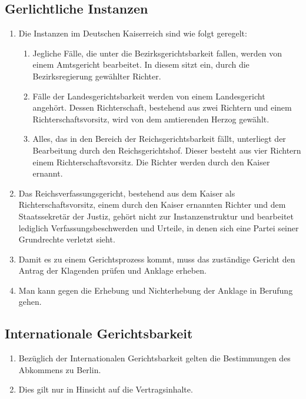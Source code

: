 \documentclass{article}
\begin{document}
\subsection{Gerlichtliche Instanzen}
\begin{enumerate}[(1)]
    \item Die Instanzen im Deutschen Kaiserreich sind wie folgt geregelt:
    \begin{enumerate}[1.]
        \item Jegliche Fälle, die unter die Bezirksgerichtsbarkeit fallen, werden von einem Amtsgericht bearbeitet. In diesem sitzt ein, durch die Bezirksregierung gewählter Richter.
        \item Fälle der Landesgerichtsbarkeit werden von einem Landesgericht angehört. Dessen Richterschaft, bestehend aus zwei Richtern und einem Richterschaftsvorsitz, wird von dem amtierenden Herzog gewählt.
        \item Alles, das in den Bereich der Reichsgerichtsbarkeit fällt, unterliegt der Bearbeitung durch den Reichsgerichtshof. Dieser besteht aus vier Richtern einem Richterschaftsvorsitz. Die Richter werden durch den Kaiser ernannt.
    \end{enumerate}
    \item Das Reichsverfassungsgericht, bestehend aus dem Kaiser als Richterschaftsvorsitz, einem durch den Kaiser ernannten Richter und dem Staatssekretär der Justiz, gehört nicht zur Instanzenstruktur und
    bearbeitet lediglich Verfassungsbeschwerden und Urteile, in denen sich eine Partei seiner Grundrechte verletzt sieht.
    \item Damit es zu einem Gerichtsprozess kommt, muss das zuständige Gericht den Antrag der Klagenden prüfen und Anklage erheben.
    \item Man kann gegen die Erhebung und Nichterhebung der Anklage in Berufung gehen.
\end{enumerate}

\subsection{Internationale Gerichtsbarkeit}
\begin{enumerate}[(1)]
    \item Bezüglich der Internationalen Gerichtsbarkeit gelten die Bestimmungen des Abkommens zu Berlin.
    \item Dies gilt nur in Hinsicht auf die Vertragsinhalte.
\end{enumerate}
\end{document}
